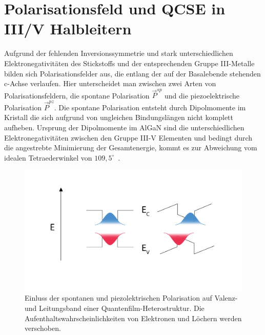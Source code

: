 \section{Polarisationsfeld und QCSE in III/V Halbleitern}

Aufgrund der fehlenden Inversionssymmetrie und stark unterschiedlichen Elektronegativitäten des Stickstoffs und der entsprechenden Gruppe III-Metalle bilden sich Polarisationsfelder aus, die entlang der auf der Basalebende stehenden c-Achse verlaufen. Hier unterscheidet man zwischen zwei Arten von Polarisationsfeldern, die spontane Polarisation $ \vec{P}^{sp} $ und die piezoelektrische Polarisation $ \vec{P}^{pz} $.
\newline\newline
Die spontane Polarisation entsteht durch Dipolmomente im Kristall die sich aufgrund von ungleichen Bindungslängen nicht komplett aufheben. Ursprung der 
Dipolmomente im AlGaN sind die unterschiedlichen Elektronegativitäten zwischen den Gruppe III-V Elementen und bedingt durch die angestrebte Minimierung der Gesamtenergie, kommt es zur Abweichung vom idealen Tetraederwinkel von $109,5^{\circ}$~\cite{ambacher2002}.
%
\begin{figure}[htb]
    \centering
    \begin{minipage}[t]{0.6\linewidth}
        \centering
        \includegraphics[width=\linewidth]{Bilder/QCSE.pdf}
       
    \end{minipage}%
    \caption{Einluss der spontanen und piezolektrischen Polarisation auf Valenz- und Leitungsband einer Quantenfilm-Heterostruktur. Die Aufenthaltswahrscheinlichkeiten von Elektronen und Löchern werden verschoben.}
        \label{fig:qcse}
\end{figure}
\vspace{1cm}
